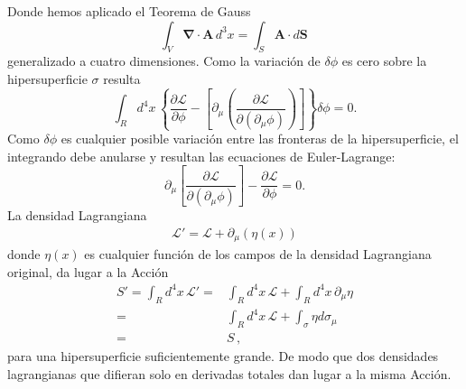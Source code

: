 Donde hemos aplicado el Teorema de Gauss
\begin{equation}
\int_V\boldsymbol{\nabla}\cdot\mathbf{A}\,d^3x=
 \int_S\mathbf{A}\cdot d\mathbf{S}\,
\end{equation}
generalizado a cuatro dimensiones. Como la variación de $\delta\phi$ es cero sobre la hipersuperficie $\sigma$ resulta 
\begin{equation}
  \int_{R}d^4x\,
  \left\{ 
    \frac{\partial\mathcal{L}}{\partial\phi}-
   \left[\partial_\mu\left(
      \frac{\partial\mathcal{L}}{\partial(\partial_\mu\phi)}
    \right)\right]
  \right\}\delta\phi=0.
\end{equation}
Como $\delta\phi$ es cualquier posible variación entre las fronteras de la hipersuperficie, el integrando debe anularse y resultan las ecuaciones de Euler-Lagrange:
\begin{equation}
\label{eq:eelcallfmu}
 \partial_\mu
  \left[
    \frac{\partial\mathcal{L}}{\partial
      (\partial_\mu\phi)}
  \right]-\frac{\partial\mathcal{L}}{\partial\phi}=0.
\end{equation}
La densidad Lagrangiana
\begin{align}
  \mathcal{L}'=\mathcal{L}+\partial_\mu(\eta(x))
\end{align}
donde $\eta(x)$ es cualquier función de los campos de la densidad Lagrangiana original, da lugar a la Acción
\begin{align}
  S'=\int_{R}d^4x\,\mathcal{L}'=&\int_{R}d^4x\,\mathcal{L}+\int_R d^4x\,\partial_\mu\eta\nonumber\\
  =&\int_{R}d^4x\,\mathcal{L}+\int_\sigma \eta d\sigma_\mu\nonumber\\
  =&S\,,
\end{align}
para una hipersuperficie suficientemente grande. De modo que dos densidades lagrangianas que difieran solo en derivadas totales dan lugar a la misma Acción.

